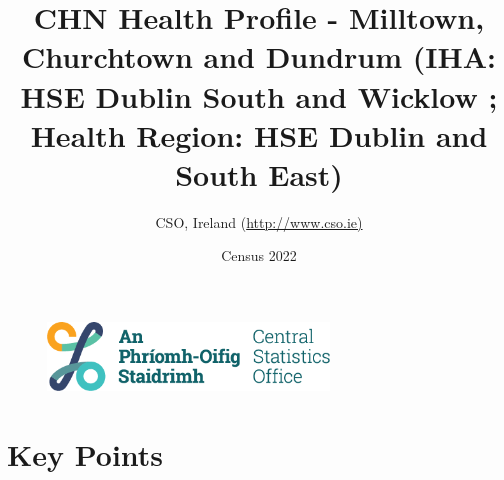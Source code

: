\documentclass{article}
\title{CHN Health Profile - Milltown, Churchtown and Dundrum (IHA: HSE Dublin South and Wicklow ;  Health Region: HSE Dublin and South East) }
\date{Census 2022}
\author{CSO, Ireland  (\url{http://www.cso.ie)}}
\begin{document}


\begin{figure}
	\centering
\includegraphics[width =75mm]{../figures/CSO_Logo.png}
\end{figure}

				 
		   
						  
														  
																																													
												 
			 
\maketitle
					
													   
				 
						 
																																																																											   
				 
				  
  \pagebreak
    	    \tableofcontents

\pagebreak


\section{Key Points}
\end{document}
